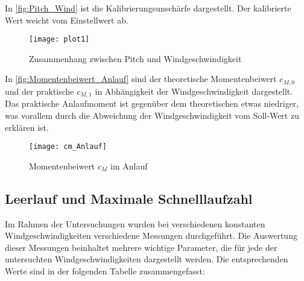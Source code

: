 In \autoref{fig:Pitch_Wind} ist die Kalibrierungsunschärfe dargestellt. Der kalibrierte Wert weicht vom Einstellwert ab.
\begin{figure}[H]
    \centering
    \texttt{[image: plot1]}
    \caption{Zusammenhang zwischen Pitch und Windgeschwindigkeit}
    \label{fig:Pitch_Wind}
\end{figure}

In \autoref{fig:Momentenbeiwert_Anlauf} sind der theoretische Momentenbeiwert $c_{M,0}$ und der praktische $c_{M,1}$ in Abhängigkeit der Windgeschwindigkeit dargestellt.
Das praktische Anlaufmoment ist gegenüber dem theoretischen etwas niedriger, was vorallem durch die Abweichung der Windgeschwindigkeit vom Soll-Wert zu erklären ist.
\begin{figure}[H]
    \centering
    \texttt{[image: cm\_Anlauf]}
    \caption{Momentenbeiwert $c_M$ im Anlauf}
    \label{fig:Momentenbeiwert_Anlauf}
\end{figure}

\subsection{Leerlauf und Maximale Schnelllaufzahl}
Im Rahmen der Untersuchungen wurden bei verschiedenen konstanten Windgeschwindigkeiten verschiedene Messungen durchgeführt.
 Die Auswertung dieser Messungen beinhaltet mehrere wichtige Parameter, die für jede der untersuchten Windgeschwindigkeiten dargestellt werden. Die entsprechenden Werte sind in der folgenden Tabelle zusammengefasst:

